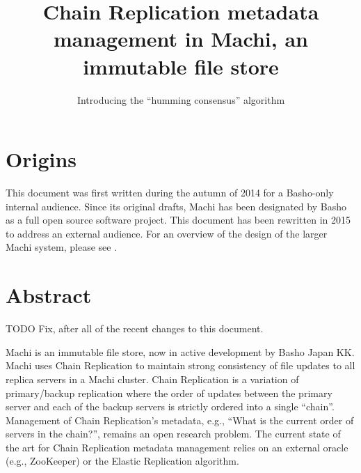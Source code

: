\documentclass[preprint,10pt]{sigplanconf}
\begin{document}

\conferenceinfo{}{} 


\title{Chain Replication metadata management in Machi, an immutable
  file store}
\subtitle{Introducing the ``humming consensus'' algorithm}


\maketitle

\section{Origins}
\label{sec:origins}

This document was first written during the autumn of 2014 for a
Basho-only internal audience.  Since its original drafts, Machi has
been designated by Basho as a full open source software project.  This
document has been rewritten in 2015 to address an external audience.
For an overview of the design of the larger Machi system, please see
\cite{machi-design}.

\section{Abstract}
\label{sec:abstract}

TODO Fix, after all of the recent changes to this document.

Machi is an immutable file store, now in active development by Basho
Japan KK.  Machi uses Chain Replication to maintain strong consistency
of file updates to all replica servers in a Machi cluster.  Chain
Replication is a variation of primary/backup replication where the
order of updates between the primary server and each of the backup
servers is strictly ordered into a single ``chain''.  Management of
Chain Replication's metadata, e.g., ``What is the current order of
servers in the chain?'', remains an open research problem.  The
current state of the art for Chain Replication metadata management
relies on an external oracle (e.g., ZooKeeper) or the Elastic
Replication algorithm.
\end{document}

